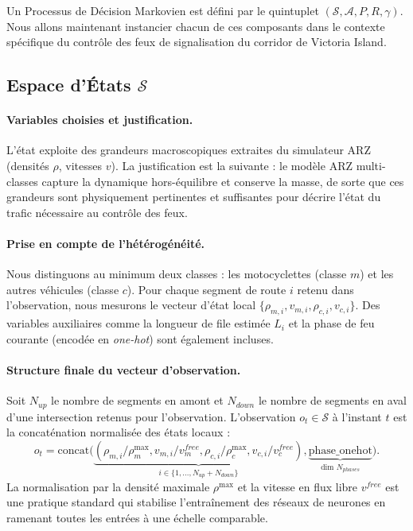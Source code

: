 Un Processus de Décision Markovien est défini par le quintuplet $(\mathcal{S}, \mathcal{A}, P, R, \gamma)$.
Nous allons maintenant instancier chacun de ces composants dans le contexte spécifique du contrôle des feux de signalisation du corridor de Victoria Island.

\subsection{Espace d'États $\mathcal{S}$}
\label{subsec:espace_etats}

\paragraph{Variables choisies et justification.}
L'état exploite des grandeurs macroscopiques extraites du simulateur ARZ (densités $\rho$, vitesses $v$). La justification est la suivante : le modèle ARZ multi-classes capture la dynamique hors-équilibre et conserve la masse, de sorte que ces grandeurs sont physiquement pertinentes et suffisantes pour décrire l'état du trafic nécessaire au contrôle des feux.

\paragraph{Prise en compte de l'hétérogénéité.}
Nous distinguons au minimum deux classes : les motocyclettes (classe $m$) et les autres véhicules (classe $c$). Pour chaque segment de route $i$ retenu dans l'observation, nous mesurons le vecteur d'état local $\{\rho_{m,i}, v_{m,i}, \rho_{c,i}, v_{c,i}\}$. Des variables auxiliaires comme la longueur de file estimée $L_i$ et la phase de feu courante (encodée en \textit{one-hot}) sont également incluses.

\paragraph{Structure finale du vecteur d'observation.}
Soit $N_{up}$ le nombre de segments en amont et $N_{down}$ le nombre de segments en aval d'une intersection retenus pour l'observation. L'observation $o_t \in \mathcal{S}$ à l'instant $t$ est la concaténation normalisée des états locaux :
\begin{equation}
o_t = \mathrm{concat}\big( \underbrace{(\rho_{m,i}/\rho^{\max}_m, v_{m,i}/v^{free}_m, \rho_{c,i}/\rho^{\max}_c, v_{c,i}/v^{free}_c)}_{i \in \{1, ..., N_{up}+N_{down}\}}, \underbrace{\text{phase\_onehot}}_{\text{dim } N_{phases}} \big).
\end{equation}
La normalisation par la densité maximale $\rho^{\max}$ et la vitesse en flux libre $v^{free}$ est une pratique standard qui stabilise l'entraînement des réseaux de neurones en ramenant toutes les entrées à une échelle comparable.

